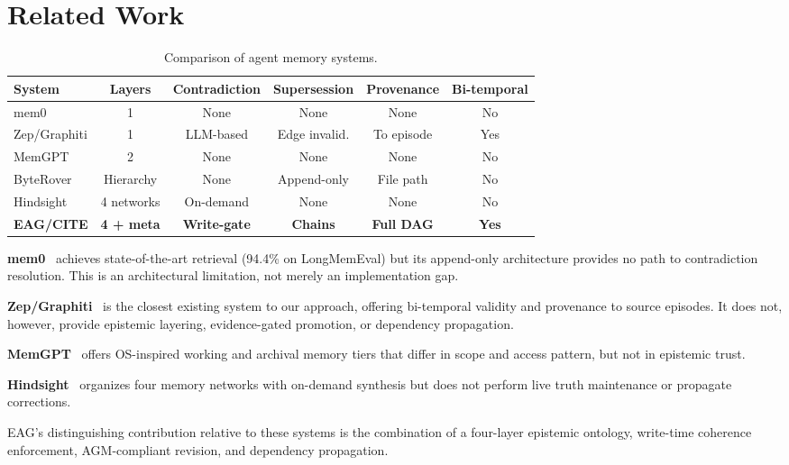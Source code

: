 \documentclass[11pt,letterpaper]{article}
\begin{document}
\section{Related Work}

\begin{table}[H]
\centering
\caption{Comparison of agent memory systems.}
\label{tab:comparison}
\begin{tabular}{@{}lccccc@{}}
\toprule
\textbf{System} & \textbf{Layers} & \textbf{Contradiction} & \textbf{Supersession} & \textbf{Provenance} & \textbf{Bi-temporal} \\
\midrule
mem0 & 1 & None & None & None & No \\
Zep/Graphiti & 1 & LLM-based & Edge invalid. & To episode & Yes \\
MemGPT & 2 & None & None & None & No \\
ByteRover & Hierarchy & None & Append-only & File path & No \\
Hindsight & 4 networks & On-demand & None & None & No \\
\textbf{EAG/CITE} & \textbf{4 + meta} & \textbf{Write-gate} & \textbf{Chains} & \textbf{Full DAG} & \textbf{Yes} \\
\bottomrule
\end{tabular}
\end{table}

\textbf{mem0}~\cite{mem0} achieves state-of-the-art retrieval (94.4\% on LongMemEval) but its append-only architecture provides no path to contradiction resolution. This is an architectural limitation, not merely an implementation gap.

\textbf{Zep/Graphiti}~\cite{graphiti2025} is the closest existing system to our approach, offering bi-temporal validity and provenance to source episodes. It does not, however, provide epistemic layering, evidence-gated promotion, or dependency propagation.

\textbf{MemGPT}~\cite{memgpt2023} offers OS-inspired working and archival memory tiers that differ in scope and access pattern, but not in epistemic trust.

\textbf{Hindsight}~\cite{hindsight} organizes four memory networks with on-demand synthesis but does not perform live truth maintenance or propagate corrections.

EAG's distinguishing contribution relative to these systems is the combination of a four-layer epistemic ontology, write-time coherence enforcement, AGM-compliant revision, and dependency propagation.
\end{document}
